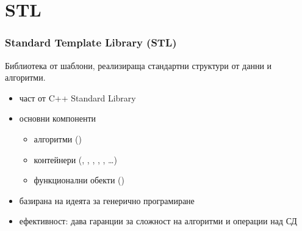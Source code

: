 \documentclass{beamer}
\begin{document}
\section{STL}

\begin{frame}
  \frametitle{Standard Template Library (STL)}

  Библиотека от шаблони, реализираща стандартни структури от данни и алгоритми.

  \begin{itemize}
  \item част от C++ Standard Library
  \item основни компоненти
    \begin{itemize}
    \item алгоритми ()
    \item контейнери (, , , , , \ldots)
    \item функционални обекти ()
    \end{itemize}
  \item базирана на идеята за генерично програмиране
  \item ефективност: дава гаранции за сложност на алгоритми и операции над СД
  \end{itemize}
\end{frame}
\end{document}
